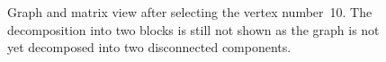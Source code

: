 \documentclass[12pt, oneside]{book}
\begin{document}
\begin{figure}[t]
\centering
{}%
\caption{Graph and matrix view after selecting the vertex number~10. The decomposition into two blocks is still not shown as the graph is not yet decomposed into two disconnected components.}
\label{selected10}
\end{figure}
\end{document}
